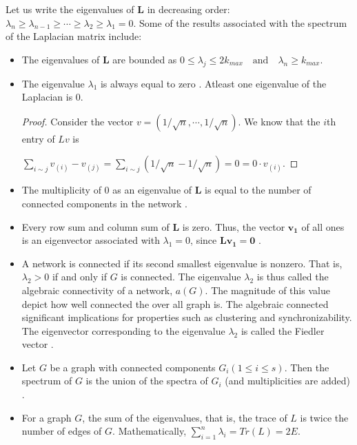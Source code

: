 \documentclass[10pt,a4paper]{article}
\begin{document}
Let us write the eigenvalues of $\mathbf{L}$ in decreasing order: $\lambda_n  \geq \lambda_{n-1} \geq  \cdots \geq \lambda_2 \geq \lambda_1 =0 $. Some of the results associated with the spectrum of the Laplacian matrix include:
\begin{itemize}
	\item The eigenvalues of $\mathbf{L}$ are bounded as 
	$ 0 \leq \lambda_j \leq 2k_{max} \quad \text{and} \quad \lambda_n \geq k_{max} $.
	\item The eigenvalue $\lambda_1$ is always equal to zero \citep{estrada2011structure}. Atleast one eigenvalue of the Laplacian is $0$.
	\begin{proof}
		Consider the vector $v= (1/\sqrt{n}, \cdots, 1/\sqrt{n}) $. We know that the $i$th entry of $Lv$ is 
		
		$\sum_{i\sim j} v_{(i)}- v_{(j)} = \sum_{i\sim j} (1/\sqrt{n} - 1/\sqrt{n}) = 0 = 0 \cdot v_{(i)}$.
	\end{proof}
	\item The multiplicity of $0$ as an eigenvalue of $\mathbf{L}$ is equal to the number of connected components in the network \citep{estrada2011structure}.
	\item Every row sum and column sum of $\mathbf{L}$ is zero. Thus, the vector $\mathbf{v_1}$ of all ones is an eigenvector associated with $\lambda_1 =0$, since $\mathbf{Lv_1} = \mathbf{0} $ \citep{das2004laplacian}.
	\item  A network is connected if its second smallest eigenvalue is nonzero. That is, $\lambda_2> 0$ if and only if $G$ is connected. The eigenvalue $\lambda_2$ is thus called the algebraic connectivity of a network, $a(G)$. The magnitude of this value depict how well connected  the over all graph is. The algebraic connected significant implications for properties such as clustering and synchronizability.
	The eigenvector corresponding to the eigenvalue $\lambda_2$ is called the Fiedler vector \citep{estrada2015first}.
	
	\item Let $G$ be a graph with connected components $G_i (1 \leq i \leq s)$. Then the spectrum of $G$ is the union of the spectra of $G_i$ (and multiplicities are added) \citep{brouwer2011spectra}.
	
	\item For a graph $G$, the sum of the eigenvalues, that is, the trace of $L$ is twice the number of edges of $G$. Mathematically, $\sum_{i=1}^n \lambda_i = Tr(L) = 2E.$\\
	
\end{itemize}
\end{document}
